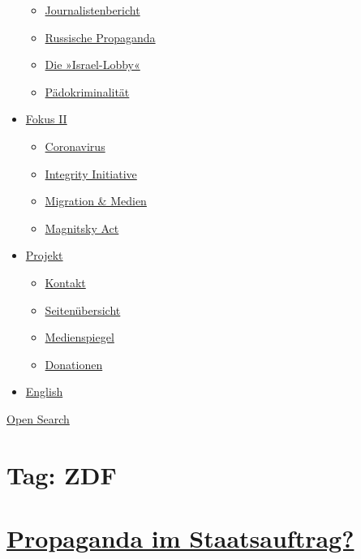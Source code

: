 \begin{itemize}
  \begin{itemize}
  \tightlist
  \item
    \href{https://swprs.org/bericht-eines-journalisten/}{Journalistenbericht}
  \item
    \href{https://swprs.org/russische-propaganda/}{Russische Propaganda}
  \item
    \href{https://swprs.org/die-israel-lobby-fakten-und-mythen/}{Die
    »Israel-Lobby«}
  \item
    \href{https://swprs.org/geopolitik-und-paedokriminalitaet/}{Pädokriminalität}
  \end{itemize}
\item
  \href{https://swprs.org/migration-und-medien/}{Fokus II}

  \begin{itemize}
  \tightlist
  \item
    \href{https://swprs.org/covid-19-hinweis-ii/}{Coronavirus}
  \item
    \href{https://swprs.org/die-integrity-initiative/}{Integrity
    Initiative}
  \item
    \href{https://swprs.org/migration-und-medien/}{Migration \& Medien}
  \item
    \href{https://swprs.org/der-fall-magnitsky/}{Magnitsky Act}
  \end{itemize}
\item
  \href{https://swprs.org/kontakt/}{Projekt}

  \begin{itemize}
  \tightlist
  \item
    \href{https://swprs.org/kontakt/}{Kontakt}
  \item
    \href{https://swprs.org/uebersicht/}{Seitenübersicht}
  \item
    \href{https://swprs.org/medienspiegel/}{Medienspiegel}
  \item
    \href{https://swprs.org/donationen/}{Donationen}
  \end{itemize}
\item
  \href{https://swprs.org/contact/}{English}
\end{itemize}

\protect\hyperlink{}{Open Search}

\hypertarget{tag-zdf}{%
\section{Tag: ZDF}\label{tag-zdf}}

\hypertarget{propaganda-im-staatsauftrag}{%
\section{\texorpdfstring{\href{https://swprs.org/2017/03/01/propaganda-im-staatsauftrag/}{Propaganda
im
Staatsauftrag?}}{Propaganda im Staatsauftrag?}}\label{propaganda-im-staatsauftrag}}

